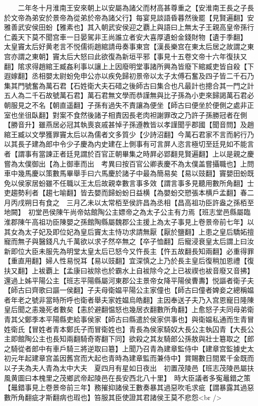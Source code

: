 　　二年冬十月淮南王安來朝上以安屬為諸父而材高甚尊重之【安淮南王長之子長於文帝為弟安於景帝為從弟於帝為諸父行】每宴見談語昏暮然後罷【見賢遍翻】安雅善武安侯田蚡【雅素也】其入朝武安侯迎之覇上與語曰上無太子王親高皇帝孫行仁義天下莫不聞宫車一日晏駕非王尚誰立者安大喜厚遺蚡金錢財物【遺于季翻】　太皇竇太后好黄老言不悦儒術趙綰請毋奏事東宫【漢長樂宫在東太后居之故謂之東宫亦謂之東朝】竇太后大怒曰此欲復為新垣平邪【事見十五卷文帝十六年復扶又翻】隂求得趙綰王臧姦利事以讓上上因廢明堂事諸所興為皆廢下綰臧吏皆自殺【下遐嫁翻】丞相嬰太尉蚡免申公亦以疾免歸初景帝以太子太傅石奮及四子皆二千石乃集其門號奮為萬石君【石姓衛大夫石碏之後師古曰集合也凡最計也摠合其一門之計五人為二千石故號萬石君】萬石君無文學而恭謹無與比子孫為小吏來歸謁萬石君必朝服見之不名【朝直遥翻】子孫有過失不責讓為便坐【師古曰便坐於便側之處非正室也坐徂臥翻】對案不食然後諸子相責因長老肉袒謝罪改之乃許子孫勝冠者在側【勝音升】雖燕居必冠其執喪哀戚甚悼子孫遵教皆以孝謹聞乎郡國【聞音問】及趙綰王臧以文學獲罪竇太后以為儒者文多質少【少詩沼翻】今萬石君家不言而躬行乃以其長子建為郎中令少子慶為内史建在上側事有可言屏人恣言極切至廷見如不能言者【謂事有當諫正者廷見謂於百官正朝畢集之時屛必郢翻見賢遍翻】上以是親之慶嘗為太僕御出【為上御車而出　考異曰按百官公卿表慶不為太僕盖嘗攝職也】上問車中幾馬慶以策數馬畢舉手曰六馬慶於諸子中最為簡易矣【易以豉翻】竇嬰田蚡既免以侯家居蚡雖不任職以王太后故親幸數言事多效【謂言事多見聽用數所角翻】士吏趨勢利者【趨七喻翻】皆去嬰而歸蚡蚡日益横【為嬰蚡交愬張本横戶孟翻】春二月丙戌朔日有食之　三月乙未以太常栢至侯許昌為丞相【昌高祖功臣許盎之孫栢至地闕】　初堂邑侯陳午尚帝姑館陶公主嫖帝之為太子公主有力焉【班志堂邑縣屬臨淮郡陳午高祖功臣陳嬰之孫館陶縣屬魏郡公主援上為太子事見上卷景帝前七年】以其女為太子妃及即位妃為皇后竇太主恃功求請無厭【厭於鹽翻】上患之皇后驕妬擅寵而無子與醫錢凡九千萬欲以求子然卒無之【卒子恤翻】后寵浸衰皇太后謂上曰汝新即位大臣未服先為明堂太皇太后已怒今又忤長主【忤五故翻長知兩翻】必重得罪【重直用翻】婦人性易悦耳【易以豉翻】宜深慎之上乃於長主皇后復稍加恩禮【復扶又翻】上袚覇上【孟康曰袚除也於霸水上自袚除今之上已袚禊也袚音廢又音拂】還過上姊平陽公主【班志平陽縣屬河東郡公主景帝女降平陽侯曹夀】悦謳者衛子夫【師古曰齊歌曰謳一侯翻】子夫母衛媪平陽公主家僮也【師古曰僮者婢妾之總稱媪者年老之號非當時所呼也衛者舉夫家姓媪烏皓翻】主因奉送子夫乃入宫恩寵日隆陳皇后聞之恚幾死者數矣【恚於避翻愠怒也幾居衣翻數所角翻】上愈怒子夫同母弟衛青其父鄭季本平陽縣吏給事侯家【師古曰縣遣於侯家供事也】與衛媪私通而生青冒姓衛氏【冒姓者青本鄭氏子而冒衛姓也】青長為侯家騎奴大長公主執囚青【大長公主即館陶公主也長知兩翻騎奇寄翻下同】欲殺之其友騎郎公孫敖與壯士簒取之【郎之騎從者郎中有車戶騎三將逆取曰簒】上聞乃召青為建章監侍中【建章宫監據史太初元年起建章宫盖因舊宫而大起也青時為建章監而兼侍中】賞賜數日間累千金既而以子夫為夫人青為太中大夫　夏四月有星如日夜出　初置茂陵邑【班志茂陵邑屬扶風黄圖曰本槐里之茂鄉武帝起陵邑在長安西北八十里】　時大臣議者多寃鼂錯之策【鼂錯事見上卷景帝前三年】務摧抑諸侯王數奏暴其過惡吹毛求疵【謂暴露其過惡數所角翻疵才斯翻病也瑕也】笞服其臣使證其君諸侯王莫不悲怨<br />
